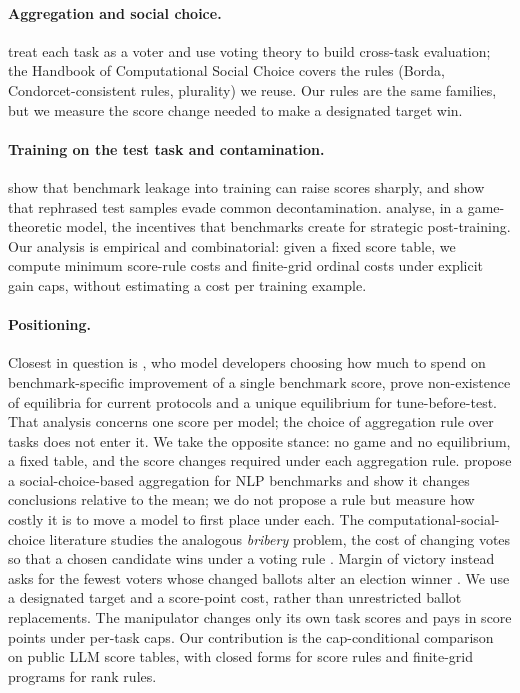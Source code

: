 \documentclass{article}
\begin{document}
\paragraph{Aggregation and social choice.}
\citet{lanctot2025vase} treat each task as a voter and use voting theory to build cross-task evaluation; the Handbook of Computational Social Choice \citep{brandt2016handbook} covers the rules (Borda, Condorcet-consistent rules, plurality) we reuse. Our rules are the same families, but we measure the score change needed to make a designated target win.

\paragraph{Training on the test task and contamination.}
\citet{zhou2023cheater} show that benchmark leakage into training can raise scores sharply, and \citet{yang2023rephrased} show that rephrased test samples evade common decontamination. \citet{chen2026incentives} analyse, in a game-theoretic model, the incentives that benchmarks create for strategic post-training. Our analysis is empirical and combinatorial: given a fixed score table, we compute minimum score-rule costs and finite-grid ordinal costs under explicit gain caps, without estimating a cost per training example.

\paragraph{Positioning.}
Closest in question is \citet{chen2026incentives}, who model developers choosing how much to spend on benchmark-specific improvement of a single benchmark score, prove non-existence of equilibria for current protocols and a unique equilibrium for tune-before-test. That analysis concerns one score per model; the choice of aggregation rule over tasks does not enter it. We take the opposite stance: no game and no equilibrium, a fixed table, and the score changes required under each aggregation rule. \citet{colombo2022best} propose a social-choice-based aggregation for NLP benchmarks and show it changes conclusions relative to the mean; we do not propose a rule but measure how costly it is to move a model to first place under each. The computational-social-choice literature studies the analogous \emph{bribery} problem, the cost of changing votes so that a chosen candidate wins under a voting rule \citep{faliszewski2009bribery,brandt2016handbook}. Margin of victory instead asks for the fewest voters whose changed ballots alter an election winner \citep{xia2012margin}. We use a designated target and a score-point cost, rather than unrestricted ballot replacements. The manipulator changes only its own task scores and pays in score points under per-task caps. Our contribution is the cap-conditional comparison on public LLM score tables, with closed forms for score rules and finite-grid programs for rank rules.
\end{document}
